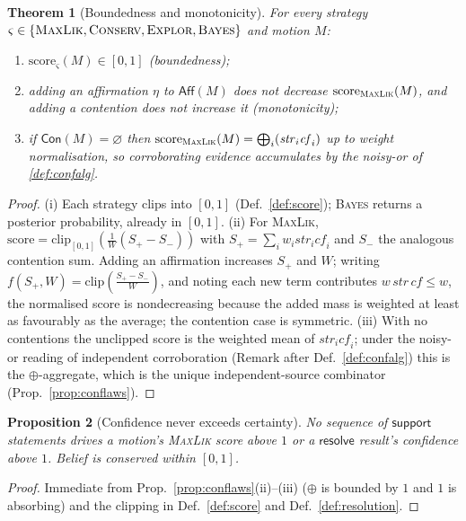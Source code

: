\documentclass[11pt,a4paper]{article}
\theoremstyle{plain}
\newtheorem{theorem}{Theorem}[section]
\newtheorem{proposition}[theorem]{Proposition}
\theoremstyle{definition}
\theoremstyle{remark}
\newcommand{\Unit}{[0,1]}
\newcommand{\nor}{\oplus}                                 %
\newcommand{\Strat}{\varsigma}
\begin{document}
\begin{theorem}[Boundedness and monotonicity]
\label{thm:evidence}
For every strategy $\Strat\in\{\textsc{MaxLik},\textsc{Conserv},\textsc{Explor},
\textsc{Bayes}\}$ and motion $M$:
\begin{enumerate}[label=(\roman*),leftmargin=1.9em,nosep]
\item $\mathrm{score}_\Strat(M)\in\Unit$ (boundedness);
\item adding an affirmation $\eta$ to $\mathsf{Aff}(M)$ does not decrease
$\mathrm{score}_{\textsc{MaxLik}}(M)$, and adding a contention does not increase
it (monotonicity);
\item if $\mathsf{Con}(M)=\varnothing$ then $\mathrm{score}_{\textsc{MaxLik}}(M)
=\bigoplus_i (\mathit{str}_i\mathit{cf}_i)$ up to weight normalisation, so
corroborating evidence accumulates by the noisy-or of \cref{def:confalg}.
\end{enumerate}
\end{theorem}
\begin{proof}
(i) Each strategy clips into $\Unit$ (Def.~\ref{def:score}); \textsc{Bayes}
returns a posterior probability, already in $\Unit$. (ii) For \textsc{MaxLik},
$\mathrm{score}=\mathrm{clip}_\Unit(\frac1W(S_+-S_-))$ with
$S_+=\sum_i w_i\mathit{str}_i\mathit{cf}_i$ and $S_-$ the analogous contention
sum. Adding an affirmation increases $S_+$ and $W$; writing $f(S_+,W)=
\mathrm{clip}(\frac{S_+-S_-}{W})$, and noting each new term contributes
$w\,\mathit{str}\,\mathit{cf}\le w$, the normalised score is nondecreasing
because the added mass is weighted at least as favourably as the average; the
contention case is symmetric. (iii) With no contentions the unclipped score is
the weighted mean of $\mathit{str}_i\mathit{cf}_i$; under the noisy-or reading
of independent corroboration (Remark after Def.~\ref{def:confalg}) this is the
$\nor$-aggregate, which is the unique independent-source combinator
(Prop.~\ref{prop:conflaws}).
\end{proof}

\begin{proposition}[Confidence never exceeds certainty]
\label{prop:noovercert}
No sequence of $\mathsf{support}$ statements drives a motion's
\textsc{MaxLik} score above $1$ or a $\mathsf{resolve}$ result's confidence
above $1$. Belief is conserved within $\Unit$.
\end{proposition}
\begin{proof}
Immediate from Prop.~\ref{prop:conflaws}(ii)--(iii) ($\nor$ is bounded by $1$
and $1$ is absorbing) and the clipping in Def.~\ref{def:score} and
Def.~\ref{def:resolution}.
\end{proof}
\end{document}
